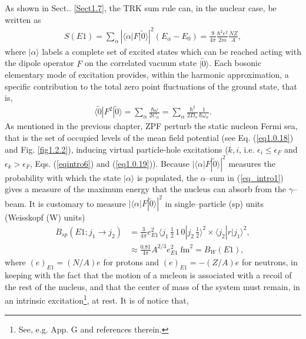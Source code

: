 As shown in Sect.. \ref{Sect1.7}, the TRK sum rule can, in the nuclear case, be written as
\begin{align}\label{eq_intro1}
S(E1)=\sum_\alpha\left|\langle\alpha|F|\tilde 0\rangle\right|^2(E_\alpha-E_0)=\frac{9}{4\pi}\frac{\hbar^2e^2}{2m}\frac{NZ}{A},
\end{align}
where $|\alpha\rangle$ labels a complete set of excited  states which can be reached acting with the dipole operator $F$ on the  correlated vacuum state $|\tilde 0\rangle$. Each bosonic elementary mode of excitation provides, within the harmonic approximation, a specific contribution to the total zero point fluctuations of the ground state, that is,
\begin{align}\label{eqintro2}
\langle\tilde 0|F^2|\tilde 0\rangle=\sum_\alpha\frac{\hbar \omega}{2C_\alpha}=\sum_\alpha\frac{\hbar^2}{2D_\alpha}\frac{1}{\hbar\omega_\alpha}.
\end{align}
As mentioned in the previous chapter, ZPF perturb the static nucleon Fermi sea, that is the set of occupied levels of the mean field potential (see Eq. (\ref{eq1.0.18}) and Fig. \ref{fig1.2.2}),
inducing virtual particle-hole excitations ($k,i$, i.e. $\epsilon_i\leq\epsilon_F$ and $\epsilon_k>\epsilon_F$,  Eqs. (\ref{eqintro6}) and (\ref{eq1.0.19})). 
Because $|\langle \alpha|F|\tilde 0\rangle|^2$ measures the probability with which the state $|\alpha\rangle$ is populated, the $\alpha$--sum in (\ref{eq_intro1}) gives a measure of the maximum energy that the nucleus can absorb from the $\gamma$--beam. It is customary to measure  $|\langle \alpha|F|\tilde0\rangle|^2$ in single--particle (sp) units (Weisskopf (W) units)
\begin{align}\label{eq1.2.5}
\nonumber B_{sp}(E1;j_1\rightarrow j_2)&=\frac{3}{4\pi}e^2_{E1}\langle j_1\, \tfrac{1}{2}\,1\,0|j_2\,\tfrac{1}{2}\rangle^2\times \langle j_2|r|j_1\rangle^2,\\
&\approx \frac{0.81}{4\pi}A^{2/3}e^2_{E1}\;\text{fm}^2=B_W(E1),
\end{align}
where $(e)_{E1}=(N/A)e$ for protons and  $(e)_{E1}=-(Z/A)e$ for neutrons, in keeping with the fact that the motion of a nucleon is associated with a recoil of the rest of the nucleus,  and that the center of mass  of the system must remain,   in an intrinsic excitation\footnote{See, e.g. \cite{Broglia:16} App. G and references therein.}, at rest. It is of notice that,


